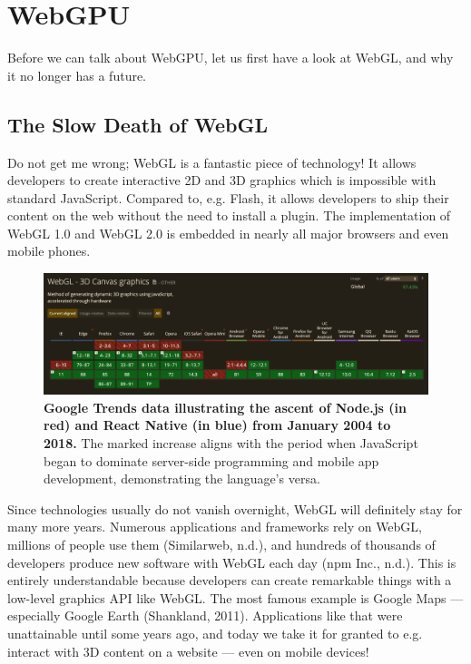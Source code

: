 \documentclass[10pt]{article}
\begin{document}
\begin{sloppypar}
  \section{WebGPU}
  \label{sec:webgpu}

  Before we can talk about WebGPU, let us first have a look at WebGL, and why it no longer has a future.

  \subsection{The Slow Death of WebGL}
  \label{subsec:the-slow-death-of-webgl}

  Do not get me wrong; WebGL is a fantastic piece of technology! It allows developers to create interactive 2D and 3D graphics which is impossible with standard JavaScript. Compared to, e.g. Flash, it allows developers to ship their content on the web without the need to install a plugin. The implementation of WebGL 1.0 and WebGL 2.0 is embedded in nearly all major browsers and even mobile phones.

  \begin{figure}[ht]
    \centering
    \includegraphics[width=\textwidth]{figures/can-i-use.png}
    \caption[Google Trends data illustrating the ascent of Node.js and React Native.]{\textbf{Google Trends data illustrating the ascent of Node.js (in red) and React Native (in blue) from January 2004 to 2018.} The marked increase aligns with the period when JavaScript began to dominate server-side programming and mobile app development, demonstrating the language's versa.}
    \label{fig:can-i-use}
  \end{figure}

  Since technologies usually do not vanish overnight, WebGL will definitely stay for many more years. Numerous applications and frameworks rely on WebGL, millions of people use them (Similarweb, n.d.), and hundreds of thousands of developers produce new software with WebGL each day (npm Inc., n.d.). This is entirely understandable because developers can create remarkable things with a low-level graphics API like WebGL. The most famous example is Google Maps — especially Google Earth (Shankland, 2011). Applications like that were unattainable until some years ago, and today we take it for granted to e.g. interact with 3D content on a website — even on mobile devices!


\end{sloppypar}
\end{document}
